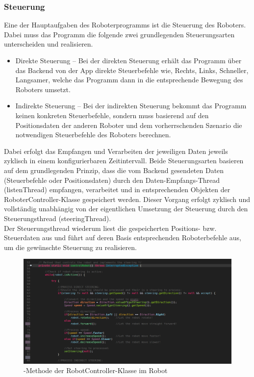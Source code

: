 \subsubsection{Steuerung}\label{robotsteuerung}
Eine der Hauptaufgaben des Roboterprogramms ist die Steuerung des Roboters. Dabei muss das Programm die folgende zwei 
grundlegenden Steuerungsarten unterscheiden und realisieren.
\begin{itemize}
	\item{Direkte Steuerung} -- Bei der direkten Steuerung erhält das Programm über das Backend von der App direkte Steuerbefehle wie,
	Rechts, Links, Schneller, Langsamer, welche das Programm dann in die entsprechende Bewegung des Roboters umsetzt.
	\item{Indirekte Steuerung} -- Bei der indirekten Steuerung bekommt das Programm keinen konkreten Steuerbefehle, sondern muss basierend
	auf den Positionsdaten der anderen Roboter und dem vorherrschenden Szenario die notwendigen Steuerbefehle des Roboters berechnen.
\end{itemize}
Dabei erfolgt das Empfangen und Verarbeiten der jeweiligen Daten jeweils zyklisch in einem konfigurierbaren Zeitintervall. Beide Steuerungsarten
basieren auf dem grundlegenden Prinzip, dass die vom Backend gesendeten Daten (Steuerbefehle oder Positionsdaten) durch den 
Daten-Empfangs-Thread (listenThread) empfangen, verarbeitet und in entsprechenden Objekten der RoboterController-Klasse gespeichert werden. 
Dieser Vorgang erfolgt zyklisch und vollständig unabhängig von der eigentlichen Umsetzung der Steuerung durch den Steuerungsthread (steeringThread). \\
Der Steuerungsthread wiederum liest die gespeicherten Positions- bzw. Steuerdaten aus und führt auf deren Basis entsprechenden Roboterbefehle 
aus, um die gewünschte Steuerung zu realisieren.
\begin{figure}[ht]
	\centering
	\includegraphics[width=1.0\textwidth]{images/implementation/controlRobotMethod1.png}
	\caption[-Methode der RobotController-Klasse im Robot]{-Methode der RobotController-Klasse im Robot}
	\label{fig:controlRobotMethode}
\end{figure}
